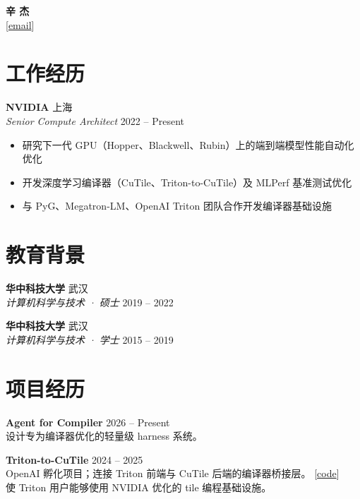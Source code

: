\documentclass[11pt,a4paper]{article}
\newcommand{\projectentry}[5]{%
    \noindent\textbf{#1} \hfill #2 \\[2pt]
    #4 \hfill {\small #3} \\[1pt]
    #5\par\vspace{8pt}%
}
\newcommand{\projectentrysingle}[3]{%
    \noindent\textbf{#1} \hfill #2 \\[2pt]
    #3\par\vspace{8pt}%
}
\begin{document}
\begin{center}
    {\Huge\bfseries 辛 杰} \\[8pt]
    [\href{mailto:cs.xinjie@gmail.com}{email}]  
\end{center}

\vspace{2pt}

\section{工作经历}

\noindent\textbf{NVIDIA} \hfill 上海 \\
\textit{Senior Compute Architect} \hfill 2022 -- Present
\begin{itemize}
    \item 研究下一代 GPU（Hopper、Blackwell、Rubin）上的端到端模型性能自动化优化
    \item 开发深度学习编译器（CuTile、Triton-to-CuTile）及 MLPerf 基准测试优化
    \item 与 PyG、Megatron-LM、OpenAI Triton 团队合作开发编译器基础设施
\end{itemize}

\vspace{4pt}

\section{教育背景}

\noindent\textbf{华中科技大学} \hfill 武汉 \\
\textit{计算机科学与技术 · 硕士} \hfill 2019 -- 2022

\vspace{6pt}

\noindent\textbf{华中科技大学} \hfill 武汉 \\
\textit{计算机科学与技术 · 学士} \hfill 2015 -- 2019

\vspace{4pt}

\section{项目经历}

\projectentrysingle{Agent for Compiler}{2026 -- Present}
{设计专为编译器优化的轻量级 harness 系统。}

\projectentry{Triton-to-CuTile}{2024 -- 2025}{[\href{https://github.com/triton-lang/Triton-to-tile-IR}{code}]}
{OpenAI 孵化项目；连接 Triton 前端与 CuTile 后端的编译器桥接层。}
{使 Triton 用户能够使用 NVIDIA 优化的 tile 编程基础设施。}
\end{document}
